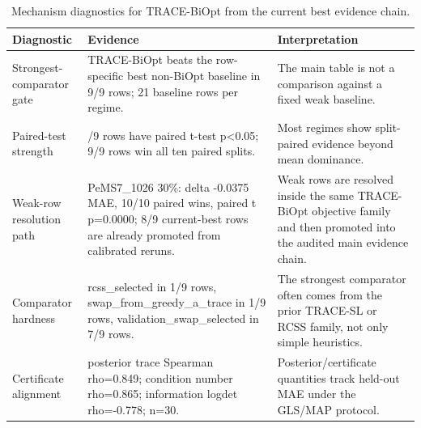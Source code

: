 \begin{table}[pos=htbp]
\centering
\caption{Mechanism diagnostics for TRACE-BiOpt from the current best evidence chain.}
\label{tab:trace-biopt-mechanism}
\small
\begin{tabularx}{\textwidth}{>{\raggedright\arraybackslash}p{}>{\raggedright\arraybackslash}p{}>{\raggedright\arraybackslash}X}
\toprule
Diagnostic & Evidence & Interpretation \\
\midrule
Strongest-comparator gate & TRACE-BiOpt beats the row-specific best non-BiOpt baseline in 9/9 rows; 21 baseline rows per regime. & The main table is not a comparison against a fixed weak baseline. \\
Paired-test strength & 9/9 rows have paired t-test p<0.05; 9/9 rows win all ten paired splits. & Most regimes show split-paired evidence beyond mean dominance. \\
Weak-row resolution path & PeMS7\_1026 30\%: delta -0.0375 MAE, 10/10 paired wins, paired t p=0.0000; 8/9 current-best rows are already promoted from calibrated reruns. & Weak rows are resolved inside the same TRACE-BiOpt objective family and then promoted into the audited main evidence chain. \\
Comparator hardness & rcss\_selected in 1/9 rows, swap\_from\_greedy\_a\_trace in 1/9 rows, validation\_swap\_selected in 7/9 rows. & The strongest comparator often comes from the prior TRACE-SL or RCSS family, not only simple heuristics. \\
Certificate alignment & posterior trace Spearman rho=0.849; condition number rho=0.865; information logdet rho=-0.778; n=30. & Posterior/certificate quantities track held-out MAE under the GLS/MAP protocol. \\
\bottomrule
\end{tabularx}
\end{table}
